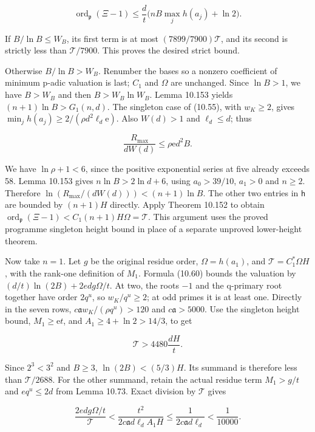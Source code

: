 \documentclass[
  11pt,
  a4paper,
]{article}
\begin{document}
\[
\operatorname{ord}_{\mathfrak p}(\Xi-1)
\le\frac d t\bigl(nB\max_jh(a_j)+\ln2\bigr).
\tag{10.465}
\]

If \(B/\ln B\le W_B\), its first term is at most
\((7899/7900)\mathcal T\), and its second is strictly less than
\(\mathcal T/7900\). This proves the desired strict bound.

Otherwise \(B/\ln B>W_B\). Renumber the bases so a nonzero coefficient
of minimum p-adic valuation is last; \(C_1\) and \(\Omega\) are
unchanged. Since \(\ln B>1\), we have \(B>W_B\) and then
\(B>W_B\ln W_B\). Lemma 10.153 yields \((n+1)\ln B>G_1(n,d)\). The
singleton case of (10.55), with \(w_K\ge2\), gives
\(\min_jh(a_j)\ge2/(\rho d^2\ell_d\mathrm e)\). Also \(W(d)>1\) and
\(\ell_d\le d\); thus

\[
\frac{R_{\max}}{dW(d)}\le\rho\mathrm e d^2 B.
\tag{10.466}
\]

We have \(\ln\rho+1<6\), since the positive exponential series at five
already exceeds 58. Lemma 10.153 gives \(n\ln B>2\ln d+6\), using
\(a_0>39/10\), \(a_1>0\) and \(n\ge2\). Therefore
\(\ln(R_{\max}/(dW(d)))<(n+1)\ln B\). The other two entries in
\(\mathsf h\) are bounded by \((n+1)H\) directly. Apply Theorem 10.152
to obtain \(\operatorname{ord}_{\mathfrak p}(\Xi-1)
<C_1(n+1)H\Omega=\mathcal T\). This argument uses the proved programme
singleton height bound in place of a separate unproved lower-height
theorem.

Now take \(n=1\). Let \(g\) be the original residue order,
\(\Omega=h(a_1)\), and \(\mathcal T=C_1^*\Omega H\), with the rank-one
definition of \(M_1\). Formula (10.60) bounds the valuation by
\((d/t)\ln(2B)+2edg\Omega/t\). At two, the roots \(-1\) and the
q-primary root together have order \(2q^u\), so \(w_K/q^u\ge2\); at odd
primes it is at least one. Directly in the seven rows,
\(c\mathfrak a w_K/(\rho q^u)>120\) and \(c\mathfrak a>5000\). Use the
singleton height bound, \(M_1\ge\mathrm e t\), and
\(A_1\ge4+\ln2>14/3\), to get

\[
\mathcal T>4480\frac{dH}{t}.
\tag{10.467}
\]

Since \(2^3<3^2\) and \(B\ge3\), \(\ln(2B)<(5/3)H\). Its summand is
therefore less than \(\mathcal T/2688\). For the other summand, retain
the actual residue term \(M_1>g/t\) and \(eq^u\le2d\) from Lemma 10.73.
Exact division by \(\mathcal T\) gives

\[
\frac{2edg\Omega/t}{\mathcal T}
<\frac{t^2}{2c\mathfrak a d\ell_d A_1H}
\le\frac1{2c\mathfrak a d\ell_d}<\frac1{10000}.
\tag{10.468}
\]
\end{document}
